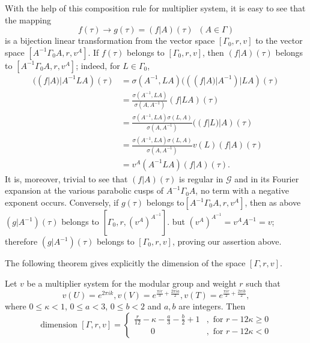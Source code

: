 With \pageoriginale the help of this composition rule for multiplier
system, it is easy to see that the mapping 
$$
f(\tau) \to g(\tau) = (f|A) (\tau) \;\; (A\in \Gamma)
$$
is a bijection linear transformation from the vector space $[\Gamma_0,
r,v]$ to the vector space $[A^{-1} \Gamma_0 A, r, v^A]$. If $f(\tau)$
belongs to $[\Gamma_0, r,v]$, then $(f|A)(\tau)$ belongs to
$[A^{-1}\Gamma_0 A, r, v^{A}]$; indeed, for $L\in \Gamma_0$, 
\begin{align*}
((f|A)|A^{-1}LA) (\tau) & = \sigma(A^{-1}, L A)(((f|A)|A^{-1})|LA)
  (\tau)\\
& = \frac{\sigma(A^{-1},LA)}{\sigma(A,A^{-1})} (f|LA)(\tau)\\
& = \frac{\sigma(A^{-1},LA)\sigma(L,A)}{\sigma(A,A^{-1})}
  ((f|L)|A)(\tau)\\
& = \frac{\sigma(A^{-1},LA)\sigma(L,A)}{\sigma(A,A^{-1})}
  v(L)(f|A)(\tau)\\
& = v^A (A^{-1}LA)(f|A)(\tau).
\end{align*}
It is, moreover, trivial to see that $(f|A)(\tau)$ is regular in
$\mathscr{G}$ and in its Fourier expansion at the various parabolic
cusps of $A^{-1}\Gamma_0A$, no term with a negative exponent
occurs. Conversely, if $g(\tau)$ belongs to\break $[A^{-1}\Gamma_0
  A,r,v^A]$, then as above $(g|A^{-1})(\tau)$ belongs to $[\Gamma_0,
  r,(v^A)^{A^{-1}}]$. but $(v^A)^{A^{-1}}=v^AA^{-1}=v$; therefore
$(g|A^{-1})(\tau)$ belongs to $[\Gamma_0, r,v]$, proving our assertion
above.

The following theorem gives explicitly the dimension of the space
$[\Gamma, r, v]$.

\begin{thm}\label{chap3:thm21}
Let $v$ be a multiplier system for the modular group and weight
\pageoriginale $r$ such that 
$$
v(U) =e^{2\pi ik}, v(V) =e^{\frac{\pi ir}{3}+\frac{2\pi ia}{2}}, v(T)
= e^{\frac{\pi i r}{2}+\frac{2\pi i b}{2}},
$$
where $0\leq \kappa < 1$, $0\leq a < 3$, $0 \leq b < 2$ and $a,b$ are
integers. Then
\begin{equation*}
\text{dimension } [\Gamma,r,v] = 
\begin{cases}
\frac{r}{12} - \kappa -\frac{a}{3} -\frac{b}{2} + 1 &, \text{ for }
r-12\kappa \geq 0\\
\qquad 0 &, \text{ for } r - 12\kappa < 0
\end{cases}
\end{equation*}
\end{thm}

